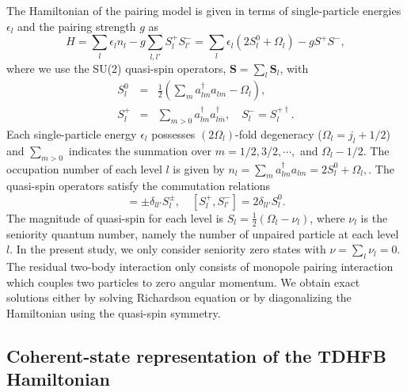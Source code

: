\documentclass[%
superscriptaddress,
preprint,
showpacs,
nofootinbib,
amsmath,amssymb,
aps,
prc,
floatfix ]%
{revtex4-1}
\begin{document}
The Hamiltonian of the pairing model is given in terms of
single-particle energies $\epsilon_l$ and the pairing strength $g$ as
\begin{equation}
	H = \sum_l \epsilon_l n_l - g \sum_{l,l'} S_l^+ S_{l'}^-
    = \sum_l\epsilon_l(2S_l^0+\Omega_l) - g S^+ S^{-} ,
\end{equation}
where we use the SU(2) quasi-spin operators,
$\boldsymbol{S}=\sum_l \boldsymbol{S}_l$, with
\begin{eqnarray}
        S_l^0 &=& \frac{1}{2}(\sum_ma_{lm}^{\dag}a_{lm}-\Omega_l) ,\\
        S_l^{+} &=& \sum_{m>0}a_{lm}^{\dag}a_{l\overline{m}}^{\dag} ,
\quad   S_l^{-} = S_l^{+\dag} .
\end{eqnarray}
Each single-particle energy $\epsilon_l$ possesses $(2\Omega_l)$-fold
degeneracy ($\Omega_l=j_l+1/2$)
and $\sum_{m>0}$ indicates the summation over $m=1/2,3/2,\cdots,$ and $\Omega_l-1/2$.
The occupation number of each level $l$ is given by
$
	n_l = \sum_m a^{\dag}_{lm}a_{lm} = 2S_l^0+\Omega_l ,
$.
The quasi-spin operators satisfy the commutation relations
\begin{equation}
  [S_l^0,S_{l'}^{\pm}] = \pm\delta_{ll'}S_{l}^{\pm},
	\quad [S_{l}^{+},S_{l'}^{-}] = 2\delta_{ll'}S_{l}^{0} .
\end{equation}
The magnitude of quasi-spin for each level is
$S_l=\frac{1}{2}(\Omega_l-\nu_l)$, where $\nu_l$ is the seniority
quantum number, namely the number of unpaired particle at each level $l$.
In the present study, we only consider seniority zero states with
$\nu=\sum_l \nu_l=0$.
The residual two-body interaction only consists of monopole pairing
interaction which couples two particles to zero angular momentum.
We obtain exact solutions either by solving Richardson equation
\cite{Richardson,Richardson2,Richardson3} or
by diagonalizing the Hamiltonian using the quasi-spin symmetry.


\subsection{Coherent-state representation of the TDHFB Hamiltonian}
\end{document}
